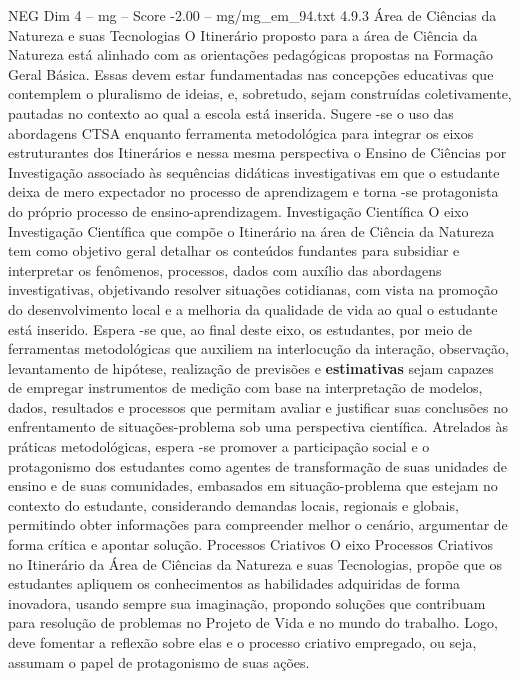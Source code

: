 \begin{textsample}{NEG Dim 4 – mg – Score -2.00 – mg/mg\_em\_94.txt}  \label{ex:f4_neg_099}
4.9.3 Área de Ciências da Natureza e suas Tecnologias O Itinerário proposto para a área de Ciência da Natureza está alinhado com as orientações pedagógicas propostas na Formação Geral Básica.
Essas devem estar fundamentadas nas concepções educativas que contemplem o pluralismo de ideias, e, sobretudo, sejam construídas coletivamente, pautadas no contexto ao qual a escola está inserida.
Sugere -se o uso das abordagens CTSA enquanto ferramenta metodológica para integrar os eixos estruturantes dos Itinerários e nessa mesma perspectiva o Ensino de Ciências por Investigação associado às sequências didáticas investigativas em que o estudante deixa de mero expectador no processo de aprendizagem e torna -se protagonista do próprio processo de ensino-aprendizagem.
Investigação Científica O eixo Investigação Científica que compõe o Itinerário na área de Ciência da Natureza tem como objetivo geral detalhar os conteúdos fundantes para subsidiar e interpretar os fenômenos, processos, dados com auxílio das abordagens investigativas, objetivando resolver situações cotidianas, com vista na promoção do desenvolvimento local e a melhoria da qualidade de vida ao qual o estudante está inserido.
Espera -se que, ao final deste eixo, os estudantes, por meio de ferramentas metodológicas que auxiliem na interlocução da interação, observação, levantamento de hipótese, realização de previsões e \textbf{estimativas} sejam capazes de empregar instrumentos de medição com base na interpretação de modelos, dados, resultados e processos que permitam avaliar e justificar suas conclusões no enfrentamento de situações-problema sob uma perspectiva científica.
Atrelados às práticas metodológicas, espera -se promover a participação social e o protagonismo dos estudantes como agentes de transformação de suas unidades de ensino e de suas comunidades, embasados em situação-problema que estejam no contexto do estudante, considerando demandas locais, regionais e globais, permitindo obter informações para compreender melhor o cenário, argumentar de forma crítica e apontar solução.
Processos Criativos O eixo Processos Criativos no Itinerário da Área de Ciências da Natureza e suas Tecnologias, propõe que os estudantes apliquem os conhecimentos as habilidades adquiridas de forma inovadora, usando sempre sua imaginação, propondo soluções que contribuam para resolução de problemas no Projeto de Vida e no mundo do trabalho.
Logo, deve fomentar a reflexão sobre elas e o processo criativo empregado, ou seja, assumam o papel de protagonismo de suas ações.

\end{textsample}
